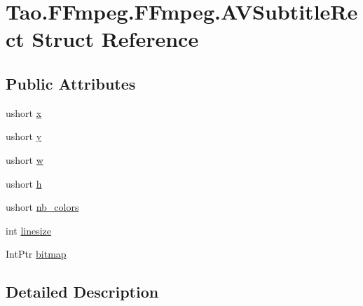 \hypertarget{struct_tao_1_1_f_fmpeg_1_1_f_fmpeg_1_1_a_v_subtitle_rect}{
\section{Tao.FFmpeg.FFmpeg.AVSubtitleRect Struct Reference}
\label{struct_tao_1_1_f_fmpeg_1_1_f_fmpeg_1_1_a_v_subtitle_rect}
}
\subsection*{Public Attributes}
\begin{DoxyCompactItemize}
\item 
ushort \hyperlink{struct_tao_1_1_f_fmpeg_1_1_f_fmpeg_1_1_a_v_subtitle_rect_ae46810c1964879135bed218453618723}{x}
\item 
ushort \hyperlink{struct_tao_1_1_f_fmpeg_1_1_f_fmpeg_1_1_a_v_subtitle_rect_ae5c3a245f95d6423cb037d35486f36e9}{y}
\item 
ushort \hyperlink{struct_tao_1_1_f_fmpeg_1_1_f_fmpeg_1_1_a_v_subtitle_rect_a7dea3b86b2fe5f83b91200dd851680ad}{w}
\item 
ushort \hyperlink{struct_tao_1_1_f_fmpeg_1_1_f_fmpeg_1_1_a_v_subtitle_rect_a3840306528f2ef536ab237fafd53f166}{h}
\item 
ushort \hyperlink{struct_tao_1_1_f_fmpeg_1_1_f_fmpeg_1_1_a_v_subtitle_rect_abd2268f28e4f204f64e989544ba6b5bf}{nb\_\-colors}
\item 
int \hyperlink{struct_tao_1_1_f_fmpeg_1_1_f_fmpeg_1_1_a_v_subtitle_rect_a1757cc39b3008507679461c7038735ad}{linesize}
\item 
IntPtr \hyperlink{struct_tao_1_1_f_fmpeg_1_1_f_fmpeg_1_1_a_v_subtitle_rect_a7a99e2fbe9f9076b59df02c4ee394eee}{bitmap}
\end{DoxyCompactItemize}


\subsection{Detailed Description}


